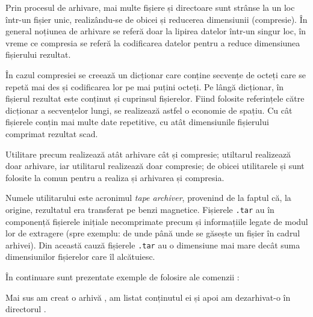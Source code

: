 Prin procesul de arhivare, mai multe fișiere și directoare sunt strânse la un
loc într-un fișier unic, realizându-se de obicei și reducerea dimensiunii (compresie). În general noțiunea de arhivare se referă doar la lipirea datelor într-un singur loc, în vreme ce compresia se referă la codificarea datelor pentru a reduce dimensiunea fișierului rezultat.

În cazul compresiei se creează un dicționar care conține secvențe de octeți care se
repetă mai des și codificarea lor pe mai puțini octeți. Pe lângă dicționar, în
fișierul rezultat este conținut și cuprinsul fișierelor. Fiind folosite referințele către
dicționar a secvențelor lungi, se realizează astfel o economie de spațiu. Cu cât
fișierele conțin mai multe date repetitive, cu atât dimensiunile fișierului comprimat rezultat scad.

Utilitare precum  realizează atât arhivare cât și compresie; utiltarul  realizează doar arhivare, iar utilitarul  realizează doar compresie; de obicei utilitarele  și  sunt folosite la comun pentru a realiza și arhivarea și compresia.

Numele utilitarului  este acronimul \textit{tape archiver}, provenind de la faptul că, la origine, rezultatul era
transferat pe benzi magnetice. Fișierele \texttt{.tar} au în componență fișierele
inițiale necomprimate precum și informațiile legate de modul lor de extragere
(spre exemplu: de unde până unde se găsește un fișier în cadrul arhivei). Din
această cauză fișierele \texttt{.tar} au o dimensiune mai mare decât suma dimensiunilor
fișierelor care îl alcătuiesc.

În continuare sunt prezentate exemple de folosire ale comenzii :


Mai sus am creat o arhivă , am listat conținutul ei și apoi am dezarhivat-o în directorul .

